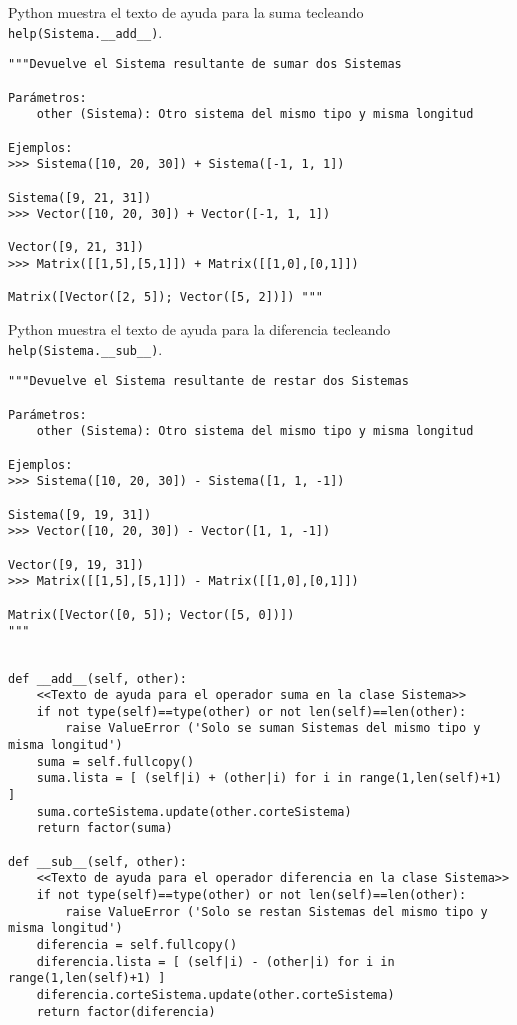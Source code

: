 \documentclass[11pt]{report}
\begin{document}
Python muestra el texto de ayuda para la suma tecleando \texttt{help(Sistema.\_\_add\_\_)}.
\begin{verbatim}
"""Devuelve el Sistema resultante de sumar dos Sistemas

Parámetros: 
    other (Sistema): Otro sistema del mismo tipo y misma longitud

Ejemplos:
>>> Sistema([10, 20, 30]) + Sistema([-1, 1, 1])

Sistema([9, 21, 31]) 
>>> Vector([10, 20, 30]) + Vector([-1, 1, 1])

Vector([9, 21, 31]) 
>>> Matrix([[1,5],[5,1]]) + Matrix([[1,0],[0,1]]) 

Matrix([Vector([2, 5]); Vector([5, 2])]) """
\end{verbatim}

Python muestra el texto de ayuda para la diferencia tecleando \texttt{help(Sistema.\_\_sub\_\_)}.
\begin{verbatim}
"""Devuelve el Sistema resultante de restar dos Sistemas

Parámetros: 
    other (Sistema): Otro sistema del mismo tipo y misma longitud

Ejemplos:
>>> Sistema([10, 20, 30]) - Sistema([1, 1, -1])

Sistema([9, 19, 31])
>>> Vector([10, 20, 30]) - Vector([1, 1, -1])

Vector([9, 19, 31])
>>> Matrix([[1,5],[5,1]]) - Matrix([[1,0],[0,1]]) 

Matrix([Vector([0, 5]); Vector([5, 0])]) 
"""
\end{verbatim}

\begin{verbatim}

def __add__(self, other):
    <<Texto de ayuda para el operador suma en la clase Sistema>>
    if not type(self)==type(other) or not len(self)==len(other):
        raise ValueError ('Solo se suman Sistemas del mismo tipo y misma longitud')
    suma = self.fullcopy()
    suma.lista = [ (self|i) + (other|i) for i in range(1,len(self)+1) ]
    suma.corteSistema.update(other.corteSistema)
    return factor(suma)
            
def __sub__(self, other):
    <<Texto de ayuda para el operador diferencia en la clase Sistema>>
    if not type(self)==type(other) or not len(self)==len(other):
        raise ValueError ('Solo se restan Sistemas del mismo tipo y misma longitud')
    diferencia = self.fullcopy()
    diferencia.lista = [ (self|i) - (other|i) for i in range(1,len(self)+1) ]
    diferencia.corteSistema.update(other.corteSistema)
    return factor(diferencia)
            
\end{verbatim}
\end{document}
